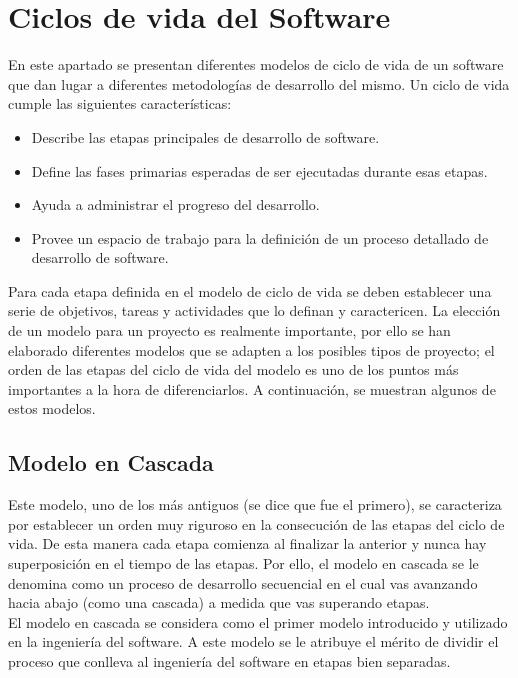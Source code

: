 \chapter{Ciclos de vida del Software}
\label{ch:tradicional}

En este apartado se presentan diferentes modelos de ciclo de vida de
un software que dan lugar a diferentes metodologías de desarrollo del
mismo. Un ciclo de vida cumple las siguientes características:
\begin{itemize}
\item Describe las etapas principales de desarrollo de software.
\item Define las fases primarias esperadas de ser ejecutadas durante
  esas etapas.
\item Ayuda a administrar el progreso del desarrollo.
\item Provee un espacio de trabajo para la definición de un proceso
  detallado de desarrollo de software.
\end{itemize}
Para cada etapa definida en el modelo de ciclo de vida se deben
establecer una serie de objetivos, tareas y actividades que lo definan
y caractericen. La elección de un modelo para un proyecto es realmente
importante, por ello se han elaborado diferentes modelos que se
adapten a los posibles tipos de proyecto; el orden de las etapas del
ciclo de vida del modelo es uno de los puntos más importantes a la
hora de diferenciarlos. A continuación, se muestran algunos de estos
modelos.

\section{Modelo en Cascada}
\label{sec:cascada}

Este modelo, uno de los más antiguos (se dice que fue el primero), se
caracteriza por establecer un orden muy riguroso en la consecución de
las etapas del ciclo de vida. De esta manera cada etapa comienza al
finalizar la anterior y nunca hay superposición en el tiempo de las
etapas. Por ello, el modelo en cascada se le denomina como un proceso
de desarrollo secuencial en el cual vas avanzando hacia abajo (como
una cascada) a medida que vas superando etapas.\\
 
El modelo en cascada se considera como el primer modelo introducido y
utilizado en la ingeniería del software. A este modelo se le atribuye
el mérito de dividir el proceso que conlleva al ingeniería del
software en etapas bien separadas.\\

